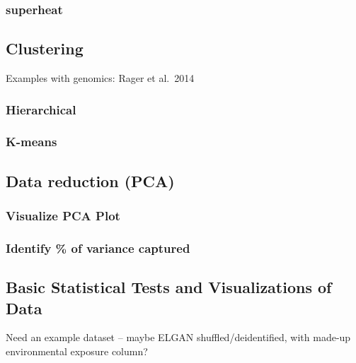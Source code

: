\documentclass[
]{article}
\begin{document}
\hypertarget{superheat}{%
\subsubsection{superheat}\label{superheat}}

\hypertarget{clustering}{%
\subsection{Clustering}\label{clustering}}

Examples with genomics: Rager et al.~2014

\hypertarget{hierarchical}{%
\subsubsection{Hierarchical}\label{hierarchical}}

\hypertarget{k-means}{%
\subsubsection{K-means}\label{k-means}}

\hypertarget{data-reduction-pca}{%
\subsection{Data reduction (PCA)}\label{data-reduction-pca}}

\hypertarget{visualize-pca-plot}{%
\subsubsection{Visualize PCA Plot}\label{visualize-pca-plot}}

\hypertarget{identify-of-variance-captured}{%
\subsubsection{Identify \% of variance captured}\label{identify-of-variance-captured}}

\hypertarget{basic-statistical-tests-and-visualizations-of-data}{%
\subsection{Basic Statistical Tests and Visualizations of Data}\label{basic-statistical-tests-and-visualizations-of-data}}

Need an example dataset -- maybe ELGAN shuffled/deidentified, with made-up environmental exposure column?
\end{document}
